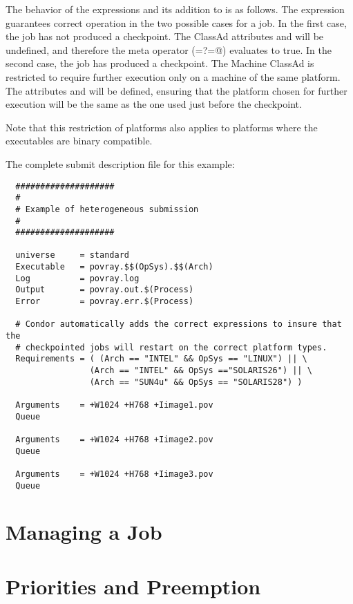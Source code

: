 The behavior of the  expressions and its addition to
 is as follows.
The  expression guarantees correct operation
in the two possible cases for a job.
In the first case, the job has not produced a checkpoint.
The ClassAd attributes  and 
will be undefined, and therefore the meta operator (\verb@=?=@)
evaluates to true.
In the second case, the job has produced a checkpoint.
The Machine ClassAd is restricted to require further execution
only on a machine of the same platform.
The attributes  and 
will be defined, ensuring that the platform chosen for further
execution will be the same as the one used just before the
checkpoint.

Note that this restriction of platforms also applies to platforms where
the executables are binary compatible.

The complete submit description file for this example:

\begin{verbatim}
  ####################
  #
  # Example of heterogeneous submission
  #
  ####################

  universe     = standard
  Executable   = povray.$$(OpSys).$$(Arch)
  Log          = povray.log
  Output       = povray.out.$(Process)
  Error        = povray.err.$(Process)

  # Condor automatically adds the correct expressions to insure that the
  # checkpointed jobs will restart on the correct platform types.
  Requirements = ( (Arch == "INTEL" && OpSys == "LINUX") || \
                 (Arch == "INTEL" && OpSys =="SOLARIS26") || \
                 (Arch == "SUN4u" && OpSys == "SOLARIS28") )

  Arguments    = +W1024 +H768 +Iimage1.pov
  Queue 

  Arguments    = +W1024 +H768 +Iimage2.pov
  Queue 

  Arguments    = +W1024 +H768 +Iimage3.pov
  Queue 
\end{verbatim}

\section{Managing a Job}


\section{\label{sec:Priorities}Priorities and Preemption}

